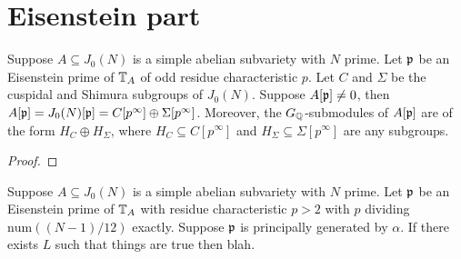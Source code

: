 \documentclass[thesis.tex]{subfiles}
\begin{document}
\section{Eisenstein part}%
\label{sec:eisenstein_part}

\begin{proposition}
    Suppose $A\subseteq J_0(N)$ is a simple abelian subvariety with $N$ prime.
    Let $\mathfrak{p}$ be an Eisenstein prime of $\mathbb{T}_A$ of odd residue characteristic
    $p$. Let $C$ and $\Sigma$
    be the cuspidal and Shimura subgroups of $J_0(N)$. Suppose $A[\mathfrak{p}]\neq 0$,
    then $A[\mathfrak{p}]=J_0(N)[\mathfrak{p}]=C[p^\infty]\oplus \Sigma[p^\infty]$. Moreover, the
    $G_{\mathbb{Q}}$-submodules of $A[\mathfrak{p}]$ are of the form $H_C\oplus H_\Sigma$, where
    $H_C\subseteq C[p^\infty]$ and $H_\Sigma\subseteq \Sigma[p^\infty]$ are any
    subgroups.
\end{proposition}
\begin{proof}
\end{proof}

\begin{corollary}
    Suppose $A\subseteq J_0(N)$ is a simple abelian subvariety with $N$ prime.
    Let $\mathfrak{p}$ be an Eisenstein prime of $\mathbb{T}_A$ with residue characteristic
    $p>2$ with $p$ dividing $\mathrm{num}((N-1)/12)$ exactly. Suppose $\mathfrak{p}$ is
    principally generated by $\alpha$. If there exists $L$ such that things are
    true then blah.
\end{corollary}
\end{document}

